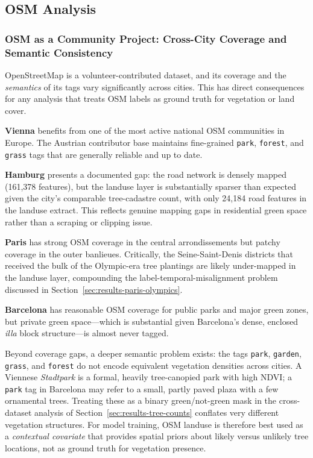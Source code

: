 \newpage
\subsection{OSM Analysis}
\subsubsection{OSM as a Community Project: Cross-City Coverage and Semantic Consistency}
OpenStreetMap is a volunteer-contributed dataset, and its coverage and the \emph{semantics} of its tags vary significantly across cities.
This has direct consequences for any analysis that treats OSM labels as ground truth for vegetation or land cover.

\textbf{Vienna} benefits from one of the most active national OSM communities in Europe. The Austrian contributor base maintains fine-grained \texttt{park}, \texttt{forest}, and \texttt{grass} tags that are generally reliable and up to date.

\textbf{Hamburg} presents a documented gap: the road network is densely mapped (161{,}378 features), but the landuse layer is substantially sparser than expected given the city's comparable tree-cadastre count, with only 24{,}184 road features in the
landuse extract. This reflects genuine mapping gaps in residential green space rather than a scraping or clipping issue.

\textbf{Paris} has strong OSM coverage in the central arrondissements but patchy coverage in the outer banlieues. Critically, the Seine-Saint-Denis districts that received the bulk of the Olympic-era tree plantings are likely under-mapped in the landuse layer, compounding the label-temporal-misalignment problem discussed in Section~\ref{sec:results-paris-olympics}.

\textbf{Barcelona} has reasonable OSM coverage for public parks and major green zones, but private green space---which is substantial given Barcelona's dense, enclosed \textit{illa} block structure---is almost never tagged.

Beyond coverage gaps, a deeper semantic problem exists: the tags \texttt{park}, \texttt{garden}, \texttt{grass}, and \texttt{forest} do not encode equivalent vegetation densities across cities. A Viennese \textit{Stadtpark} is a formal, heavily tree-canopied park with high NDVI;
a \texttt{park} tag in Barcelona may refer to a small, partly paved plaza with a few ornamental trees. Treating these as a binary green/not-green mask in the cross-dataset analysis of Section~\ref{sec:results-tree-counts} conflates very different vegetation structures. For model training, OSM landuse is therefore best used as a \emph{contextual covariate} that provides spatial priors about likely versus unlikely tree locations, not as ground truth for vegetation presence.

